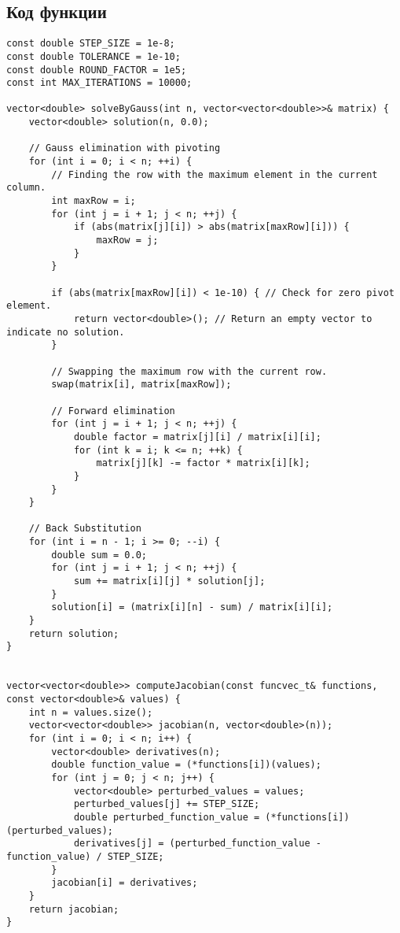 \subsection{Код функции}
\begin{lstlisting}
const double STEP_SIZE = 1e-8;
const double TOLERANCE = 1e-10;
const double ROUND_FACTOR = 1e5;
const int MAX_ITERATIONS = 10000;

vector<double> solveByGauss(int n, vector<vector<double>>& matrix) {
    vector<double> solution(n, 0.0);

    // Gauss elimination with pivoting
    for (int i = 0; i < n; ++i) {
        // Finding the row with the maximum element in the current column.
        int maxRow = i;
        for (int j = i + 1; j < n; ++j) {
            if (abs(matrix[j][i]) > abs(matrix[maxRow][i])) {
                maxRow = j;
            }
        }

        if (abs(matrix[maxRow][i]) < 1e-10) { // Check for zero pivot element.
            return vector<double>(); // Return an empty vector to indicate no solution.
        }

        // Swapping the maximum row with the current row.
        swap(matrix[i], matrix[maxRow]);
        
        // Forward elimination
        for (int j = i + 1; j < n; ++j) {
            double factor = matrix[j][i] / matrix[i][i];
            for (int k = i; k <= n; ++k) {
                matrix[j][k] -= factor * matrix[i][k];
            }
        }
    }

    // Back Substitution
    for (int i = n - 1; i >= 0; --i) {
        double sum = 0.0;
        for (int j = i + 1; j < n; ++j) {
            sum += matrix[i][j] * solution[j];
        }
        solution[i] = (matrix[i][n] - sum) / matrix[i][i];
    }
    return solution;
}


vector<vector<double>> computeJacobian(const funcvec_t& functions, const vector<double>& values) {
    int n = values.size();
    vector<vector<double>> jacobian(n, vector<double>(n));
    for (int i = 0; i < n; i++) {
        vector<double> derivatives(n);
        double function_value = (*functions[i])(values);
        for (int j = 0; j < n; j++) {
            vector<double> perturbed_values = values;
            perturbed_values[j] += STEP_SIZE;
            double perturbed_function_value = (*functions[i])(perturbed_values);
            derivatives[j] = (perturbed_function_value - function_value) / STEP_SIZE;
        }
        jacobian[i] = derivatives;
    }
    return jacobian;
}


\end{lstlisting}
